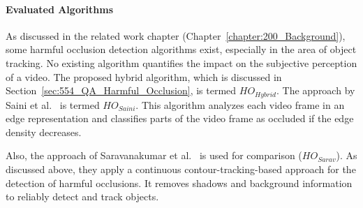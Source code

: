 \paragraph{Evaluated Algorithms}
As discussed in the related work chapter (Chapter~\ref{chapter:200_Background}), some harmful occlusion detection algorithms exist, especially in the area of object tracking. 
No existing algorithm quantifies the impact on the subjective perception of a video.
The proposed hybrid algorithm, which is discussed in Section~\ref{sec:554_QA_Harmful_Occlusion}, is termed $HO_{Hybrid}$.
The approach by Saini et al.~\cite{Saini2012} is termed $HO_{Saini}$.
This algorithm analyzes each video frame in an edge representation and classifies parts of the video frame as occluded if the edge density decreases.

Also, the approach of Saravanakumar et al.~\cite{Saravanakumar2012} is used for comparison ($HO_{Sarav}$).
As discussed above, they apply a continuous contour-tracking-based approach for the detection of harmful occlusions.
It removes shadows and background information to reliably detect and track objects.
